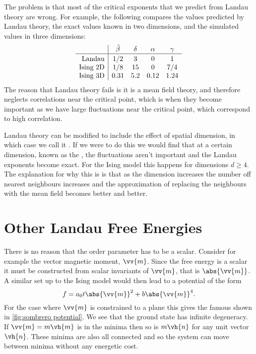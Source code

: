 \documentclass[fleqn]{NotesClass}
\begin{document}
    The problem is that most of the critical exponents that we predict from Landau theory are wrong.
    For example, the following compares the values predicted by Landau theory, the exact values known in two dimensions, and the simulated values in three dimensions:
    \begin{equation}
        \begin{array}{r|cccc}
            & \tilde{\beta} & \delta & \alpha & \gamma\\\hline
            \text{Landau}\rule{0pt}{10pt} & 1/2 & 3 & 0 & 1\\
            \text{Ising 2D} & 1/8 & 15 & 0 & 7/4\\
            \text{Ising 3D} & 0.31 & 5.2 & 0.12 & 1.24
        \end{array}
    \end{equation}
    The reason that Landau theory fails is it is a mean field theory, and therefore neglects correlations near the critical point, which is when they become important as we have large fluctuations near the critical point, which correspond to high correlation.
    
    Landau theory can be modified to include the effect of spatial dimension, in which case we call it .
    If we were to do this we would find that at a certain dimension, known as the , the fluctuations aren't important and the Landau exponents become exact.
    For the Ising model this happens for dimensions \(d \ge 4\).
    The explanation for why this is is that as the dimension increases the number off nearest neighbours increases and the approximation of replacing the neighbours with the mean field becomes better and better.
    
    \section{Other Landau Free Energies}
    There is no reason that the order parameter has to be a scalar.
    Consider for example the vector magnetic moment, \(\vv{m}\).
    Since the free energy is a scalar it must be constructed from scalar invariants of \(\vv{m}\), that is \(\abs{\vv{m}}\).
    A similar set up to the Ising model would then lead to a potential of the form
    \begin{equation}
        f = a_0t\abs{\vv{m}}^2 + b\abs{\vv{m}}^4.
    \end{equation}
    For the case where \(\vv{m}\) is constrained to a plane this gives the famous  shown in \cref{fig:sombrero potential}.
    We see that the ground state has infinite degeneracy.
    If \(\vv{m} = m\vh{m}\) is in the minima then so is \(m\vh{n}\) for any unit vector \(\vh{n}\).
    These minima are also all connected and so the system can move between minima without any energetic cost.
    
\end{document}
